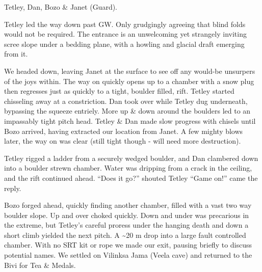 Tetley, Dan, Bozo \& Janet (Guard).

Tetley led the way down past GW. Only grudgingly agreeing that blind
folds would not be required. The entrance is an unwelcoming yet
strangely inviting scree slope under a bedding plane, with a howling and
glacial draft emerging from it.

We headed down, leaving Janet at the surface to see off any would-be
unsurpers of the joys within. The way on quickly opens up to a chamber
with a snow plug then regresses just as quickly to a tight, boulder
filled, rift. Tetley started chisseling away at a constriction. Dan took
over while Tetley dug underneath, bypassing the squeeze entriely. More
up \& down around the boulders led to an impassably tight pitch head.
Tetley \& Dan made slow progress with chisels until Bozo arrived, having
extracted our location from Janet. A few mighty blows later, the way on
was clear (still tight though - will need more destruction).

Tetley rigged a ladder from a securely wedged boulder, and Dan clambered
down into a boulder strewn chamber. Water was dripping from a crack in
the ceiling, and the rift continued ahead. ``Does it go?'' shouted
Tetley ``Game on!'' came the reply.

Bozo forged ahead, quickly finding another chamber, filled with a vast
two way boulder slope. Up and over choked quickly. Down and under was
precarious in the extreme, but Tetley's careful proress under the
hanging death and down a short climb yielded the next pitch. A
\textasciitilde 20 m drop into a large fault controlled chamber. With no
SRT kit or rope we made our exit, pausing briefly to discuss potential
names. We settled on Vilinksa Jama (Veela cave) and returned to the Bivi
for Tea \& Medals. 


